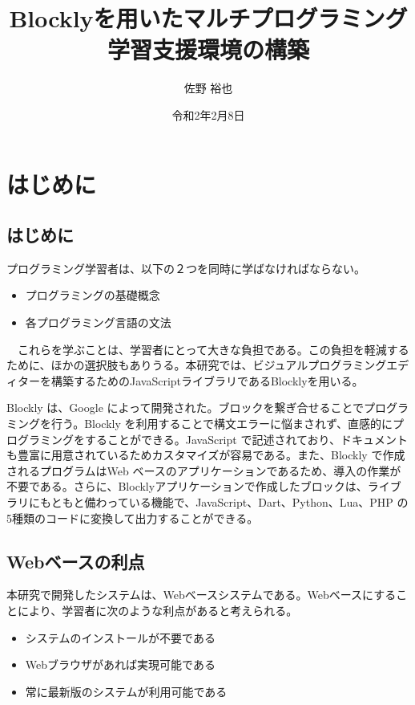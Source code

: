 \documentclass{risepaper}
\title {Blocklyを用いたマルチプログラミング学習支援環境の構築}
\author{佐野 裕也}
\date{令和2年2月8日}
\begin{document}
 
\maketitle
                                                          
   \chapter{はじめに}
   
   \section{はじめに}


  プログラミング学習者は、以下の２つを同時に学ばなければならない。
  
\begin{itemize}
\item プログラミングの基礎概念
\item 各プログラミング言語の文法
\end{itemize} 

　これらを学ぶことは、学習者にとって大きな負担である。この負担を軽減するために、ほかの選択肢もありうる。本研究では、ビジュアルプログラミングエディターを構築するためのJavaScriptライブラリであるBlockly\cite{Blockly}を用いる。
  
Blockly は、Google によって開発された。ブロックを繋ぎ合せることでプログラミングを行う。Blockly を利用することで構文エラーに悩まされず、直感的にプログラミングをすることができる。JavaScript で記述されており、ドキュメントも豊富に用意されているためカスタマイズが容易である。また、Blockly で作成されるプログラムはWeb ベースのアプリケーションであるため、導入の作業が不要である。さらに、Blocklyアプリケーションで作成したブロックは、ライブラリにもともと備わっている機能で、JavaScript、Dart、Python、Lua、PHP の5種類のコードに変換して出力することができる。

   \section{Webベースの利点}
   
本研究で開発したシステムは、Webベースシステムである。Webベースにすることにより、学習者に次のような利点があると考えられる。

\begin{itemize}
\item システムのインストールが不要である
\item Webブラウザがあれば実現可能である
\item 常に最新版のシステムが利用可能である
\end{itemize} 
\end{document}
